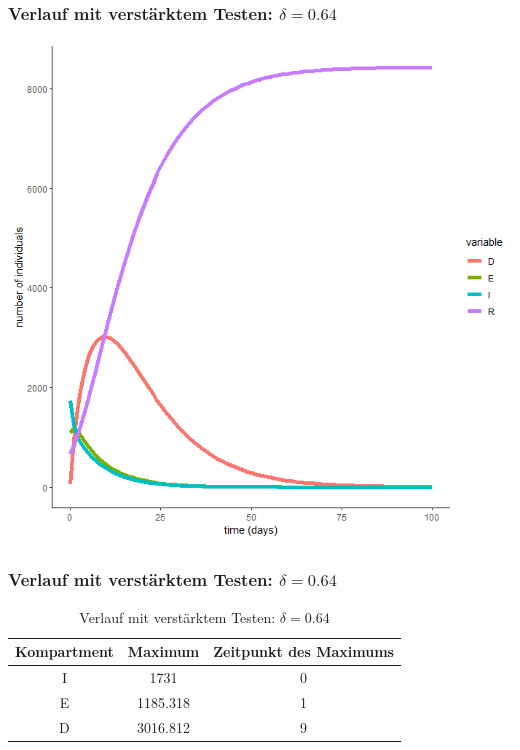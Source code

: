 \documentclass{beamer}
\begin{document}
\begin{frame}
	\frametitle{Verlauf mit verstärktem Testen: $\delta = 0.64$}
	\begin{center}
		\includegraphics[scale=0.45]{delta=0,64,beta_unveraendert,ohne_s.png}
	\end{center}
\end{frame}

\begin{frame}
	\frametitle{Verlauf mit verstärktem Testen: $\delta = 0.64$}
	\begin{table}[h]
		\caption{Verlauf mit verstärktem Testen: $\delta = 0.64$}
		\centering
		\begin{tabular}{@{}ccc@{}}
			\toprule
			Kompartment & Maximum & Zeitpunkt des Maximums\\ 
			\midrule
			I & 1731 & 0\\ 
			E & 1185.318 & 1\\ 
			D & 3016.812 &  9\\ 
			\bottomrule
		\end{tabular}
	\end{table}
\end{frame}
\end{document}
